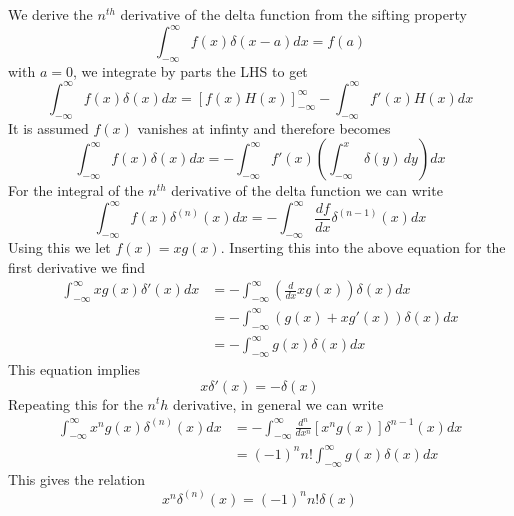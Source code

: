 \documentclass[a4paper,12pt,titlepage]{article}
\begin{document}
We derive the $n^{th}$ derivative of the delta function from the sifting property
%
\begin{equation}
\int_{-\infty}^{\infty}f(x)\delta(x-a)dx=f(a)
\end{equation}
%
with $a=0$, we integrate by parts the LHS to get
%
\begin{equation}
\int_{-\infty}^{\infty}f(x)\delta(x)dx=\left[f(x)H(x)\right]^{\infty}_{-\infty}-\int_{-\infty}^{\infty}f'(x)H(x)dx
\end{equation}
%
It is assumed $f(x)$ vanishes at infinty and therefore becomes
%
\begin{equation}
\int_{-\infty}^{\infty}f(x)\delta(x)dx=-\int_{-\infty}^{\infty}f'(x)\left(\int_{-\infty}^{x}\delta(y)\,dy\right)dx
\end{equation}
%
For the integral of the $n^{th}$ derivative of the delta function we can write
%
\begin{equation}
\int_{-\infty}^{\infty}f(x)\delta^{(n)}(x)dx=-\int_{-\infty}^{\infty}\frac{df}{dx}\delta^{(n-1)}(x)dx
\end{equation}
%
Using this we let $f(x)=xg(x)$. Inserting this into the above equation for the first derivative we find
%
\begin{align}
\int_{-\infty}^{\infty}xg(x)\delta'(x)dx&=-\int_{-\infty}^{\infty}\left(\frac{d}{dx}xg(x)\right)\delta(x)dx \\
&=-\int_{-\infty}^{\infty}\left(g(x)+xg'(x)\right)\delta(x)dx \\
&=-\int_{-\infty}^{\infty}g(x)\delta(x)dx
\end{align}
%
This equation implies
%
\begin{equation}
x\delta'(x)=-\delta(x)
\end{equation}
%
Repeating this for the $n^th$ derivative, in general we can write
%
\begin{align}
\int_{-\infty}^{\infty}x^{n}g(x)\delta^{(n)}(x)dx&=-\int_{-\infty}^{\infty}\frac{d^n}{dx^n}\left[x^{n}g(x)\right]\delta^{n-1}(x)dx \\
&=(-1)^{n}n!\int_{-\infty}^{\infty}g(x)\delta(x)dx
\end{align}
%
This gives the relation
%
\begin{equation}
x^{n}\delta^{(n)}(x)=(-1)^{n}n!\delta(x)
\end{equation}
%
\end{document}

